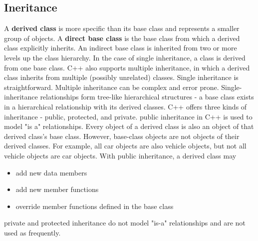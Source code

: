 \documentclass{report}
\begin{document}
    \subsection{Ineritance}
    \bigbreak \noindent 
    A \textbf{derived class} is more specific than its base class and represents a smaller group of objects.
    \bigbreak \noindent 
    A \textbf{direct base class} is the base class from which a derived class explicitly inherits. An indirect base class is inherited from two or more levels up the class hierarchy.
    \bigbreak \noindent 
    In the case of single inheritance, a class is derived from one base class. C++ also supports multiple inheritance, in which a derived class inherits from multiple (possibly unrelated) classes. Single inheritance is straightforward. Multiple inheritance can be complex and error prone.
    \bigbreak \noindent 
    Single-inheritance relationships form tree-like hierarchical structures - a base class exists in a hierarchical relationship with its derived classes.
    \bigbreak \noindent 
    C++ offers three kinds of inheritance - public, protected, and private. public inheritance in C++ is used to model "is a" relationships. Every object of a derived class is also an object of that derived class's base class. However, base-class objects are not objects of their derived classes. For example, all car objects are also vehicle objects, but not all vehicle objects are car objects.
    \bigbreak \noindent 
    With public inheritance, a derived class may
    \begin{itemize}
        \item add new data members
        \item add new member functions
        \item override member functions defined in the base class
    \end{itemize}
    private and protected inheritance do not model "is-a" relationships and are not used as frequently.

    \bigbreak \noindent 
\end{document}

